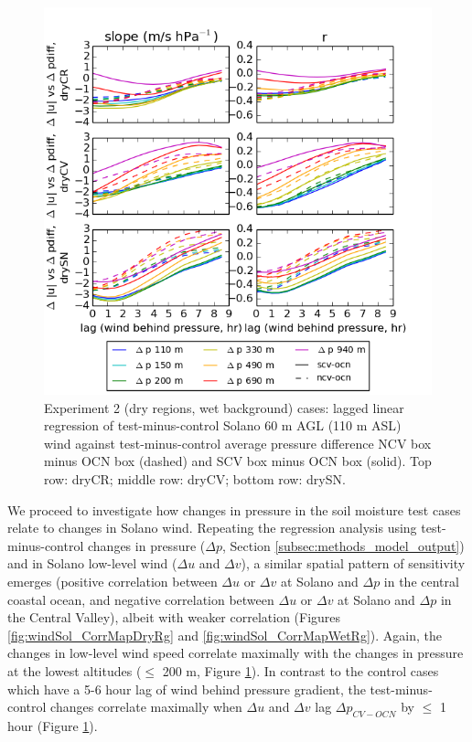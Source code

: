\begin{figure}[here]
\includegraphics[width=1\textwidth]{ch3-wind/img/lag_corr_dpdiff_combo_ncv_scv_d02_testminusctrl.png}
\caption{Experiment 2 (dry regions, wet background) cases: lagged linear regression of test-minus-control Solano 60 m AGL (110 m ASL) wind against test-minus-control average pressure difference NCV box minus OCN box (dashed) and SCV box minus OCN box (solid).  Top row: dryCR; middle row: dryCV; bottom row: drySN.}
\label{fig:windSol_LagCorrTest}
\end{figure}

We proceed to investigate how changes in pressure in the soil moisture test cases relate to changes in Solano wind.  Repeating the regression analysis using test-minus-control changes in pressure ($\Delta p$, Section \ref{subsec:methods_model_output}) and in Solano low-level wind ($\Delta u$ and $\Delta v$), a similar spatial pattern of sensitivity emerges (positive correlation between $\Delta u$ or $\Delta v$ at Solano and $\Delta p$ in the central coastal ocean, and negative correlation between $\Delta u$ or $\Delta v$ at Solano and $\Delta p$ in the Central Valley), albeit with weaker correlation (Figures \ref{fig:windSol_CorrMapDryRg} and \ref{fig:windSol_CorrMapWetRg}).  Again, the changes in low-level wind speed correlate maximally with the changes in pressure at the lowest altitudes ($\le$ 200 m, Figure \ref{fig:windSol_LagCorrTest}).  In contrast to the control cases which have a 5-6 hour lag of wind behind pressure gradient, the test-minus-control changes correlate maximally when $\Delta u$ and $\Delta v$ lag $\Delta p_{CV-OCN}$ by $\le$ 1 hour (Figure \ref{fig:windSol_LagCorrTest}).


